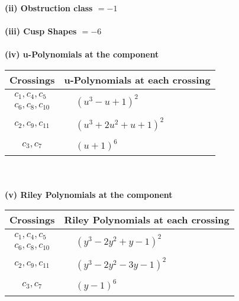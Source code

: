 \documentclass[1p]{elsarticle_modified}
\theoremstyle{definition}
\begin{document}
\flushleft \textbf{(ii) Obstruction class $= -1$}\\~\\
\flushleft \textbf{(iii) Cusp Shapes $= -6$}\\~\\
\newpage\renewcommand{\arraystretch}{1}
\flushleft \textbf{(iv) u-Polynomials at the component}\newline \\
\begin{tabular}{m{50pt}|m{274pt}}
Crossings & \hspace{64pt}u-Polynomials at each crossing \\
\hline $$\begin{aligned}c_{1},c_{4},c_{5}\\c_{6},c_{8},c_{10}\end{aligned}$$&$\begin{aligned}
&(u^3- u+1)^2
\end{aligned}$\\
\hline $$\begin{aligned}c_{2},c_{9},c_{11}\end{aligned}$$&$\begin{aligned}
&(u^3+2 u^2+u+1)^2
\end{aligned}$\\
\hline $$\begin{aligned}c_{3},c_{7}\end{aligned}$$&$\begin{aligned}
&(u+1)^6
\end{aligned}$\\
\hline
\end{tabular}\\~\\
\newpage\renewcommand{\arraystretch}{1}
\flushleft \textbf{(v) Riley Polynomials at the component}\newline \\
\begin{tabular}{m{50pt}|m{274pt}}
Crossings & \hspace{64pt}Riley Polynomials at each crossing \\
\hline $$\begin{aligned}c_{1},c_{4},c_{5}\\c_{6},c_{8},c_{10}\end{aligned}$$&$\begin{aligned}
&(y^3-2 y^2+y-1)^2
\end{aligned}$\\
\hline $$\begin{aligned}c_{2},c_{9},c_{11}\end{aligned}$$&$\begin{aligned}
&(y^3-2 y^2-3 y-1)^2
\end{aligned}$\\
\hline $$\begin{aligned}c_{3},c_{7}\end{aligned}$$&$\begin{aligned}
&(y-1)^6
\end{aligned}$\\
\hline
\end{tabular}\\~\\
\end{document}
